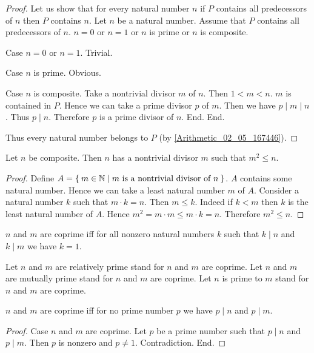 \documentclass[../../natural-numbers.ftl.tex]{subfiles}
\begin{document}
\begin{forthel}
\begin{proof}
      Let us show that for every natural number $n$ if $P$ contains all predecessors of $n$ then $P$ contains $n$.
        Let $n$ be a natural number.
        Assume that $P$ contains all predecessors of $n$.
        $n = 0$ or $n = 1$ or $n$ is prime or $n$ is composite.

        Case $n = 0$ or $n = 1$. Trivial.

        Case $n$ is prime. Obvious.

        Case $n$ is composite.
          Take a nontrivial divisor $m$ of $n$.
          Then $1 < m < n$.
          $m$ is contained in $P$.
          Hence we can take a prime divisor $p$ of $m$.
          Then we have $p \mid m \mid n$.
          Thus $p \mid n$.
          Therefore $p$ is a prime divisor of $n$.
        End.
      End.

      Thus every natural number belongs to $P$ (by \ref{Arithmetic_02_05_167446}).
    \end{proof}

    \begin{proposition}\label{Arithmetic_03_04_306779}
      Let $n$ be composite.
      Then $n$ has a nontrivial divisor $m$ such that $m^{2} \leq n$.
    \end{proposition}
    \begin{proof}
      Define $A = \Set{m \in \mathbb{N} | \text{$m$ is a nontrivial divisor of $n$}}$.
      $A$ contains some natural number.
      Hence we can take a least natural number $m$ of $A$.
      Consider a natural number $k$ such that $m \cdot k = n$.
      Then $m \leq k$.
      Indeed if $k < m$ then $k$ is the least natural number of $A$.
      Hence $m^{2} = m \cdot m \leq m \cdot k = n$.
      Therefore $m^{2} \leq n$.
    \end{proof}

    \begin{definition}
      $n$ and $m$ are coprime iff for all nonzero natural numbers $k$ such that $k \mid n$ and $k \mid m$ we have $k = 1$.
    \end{definition}

    Let $n$ and $m$ are relatively prime stand for $n$ and $m$ are coprime.
    Let $n$ and $m$ are mutually prime stand for $n$ and $m$ are coprime.
    Let $n$ is prime to $m$ stand for $n$ and $m$ are coprime.

    \begin{proposition}\label{Arithmetic_03_04_356588}
      $n$ and $m$ are coprime iff for no prime number $p$ we have $p \mid n$ and $p \mid m$.
    \end{proposition}
    \begin{proof}
      Case $n$ and $m$ are coprime.
        Let $p$ be a prime number such that $p \mid n$ and $p \mid m$.
        Then $p$ is nonzero and $p \neq 1$.
        Contradiction.
      End.


\end{proof}
\end{forthel}
\end{document}
